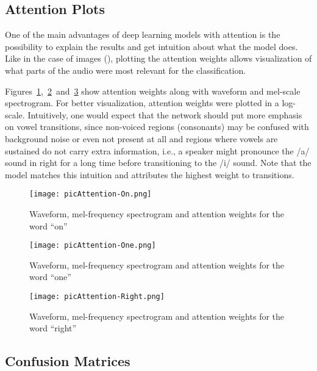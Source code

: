 \documentclass[authoryear, review, 12pt, 3p]{elsarticle}
\begin{document}
\subsection{Attention Plots}
\label{secAttPlots}

One of the main advantages of deep learning models with attention is the possibility to explain the results and get intuition about what the model does. Like in the case of images (\cite{DBLP:journals/corr/XuBKCCSZB15}), plotting the attention weights allows visualization of what parts of the audio were most relevant for the classification.

Figures~\ref{figAttON},~\ref{figAttONE}~and~\ref{figAttRIGHT} show attention weights along with waveform and mel-scale spectrogram. For better visualization, attention weights were plotted in a log-scale. Intuitively, one would expect that the network should put more emphasis on vowel transitions, since non-voiced regions (consonants) may be confused with background noise or even not present at all and regions where vowels are sustained do not carry extra information, i.e., a speaker might pronounce the /a/ sound in right for a long time before transitioning to the /i/ sound. Note that the model matches this intuition and attributes the highest weight to transitions.

\begin{figure}[!ht]
\centering
\texttt{[image: picAttention-On.png]}
\caption{Waveform, mel-frequency spectrogram and attention weights for the word ``on''}
\label{figAttON}
\end{figure}

\begin{figure}[!ht]
\centering
\texttt{[image: picAttention-One.png]}
\caption{Waveform, mel-frequency spectrogram and attention weights for the word ``one''}
\label{figAttONE}
\end{figure}

\begin{figure}[!ht]
\centering
\texttt{[image: picAttention-Right.png]}
\caption{Waveform, mel-frequency spectrogram and attention weights for the word ``right''}
\label{figAttRIGHT}
\end{figure}

\subsection{Confusion Matrices}
\label{secConfMatrices}
\end{document}
